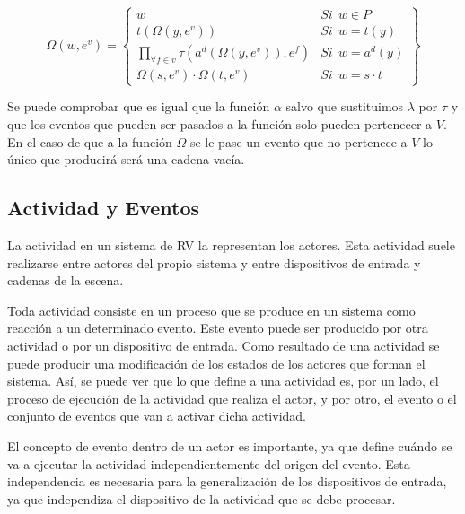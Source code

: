 \documentclass{egpubl}
\begin{document}
\begin{equation}
 	\Omega (w, e^{v}) = \left\{
	\begin{matrix}
		w    &    \mathit{Si} \ \ w \in P  \\

		t( \Omega (y, e^{v}))    &    \mathit{Si} \ \ w = t(y)  \\

		\underset{ \forall f \in v} {\prod} \tau (a^{d} (\Omega (y, e^{v})), e^{f})  &
			\mathit{Si}  \ \ w = a^{d}(y)   \\

		\Omega (s, e^{v}) \cdot \Omega (t, e^{v})   &  \mathit{Si} \ \ w = s {\cdot} t
	\end{matrix}\right\}
\end{equation}



Se puede comprobar que es igual que la
funci\'on $\alpha$ salvo que sustituimos $\lambda$ por $\tau$ y que los eventos que
pueden ser pasados a la funci\'on solo pueden pertenecer a $V$. 
En el caso de que a la funci\'on $\Omega$ se le pase
un evento que no pertenece a $V$ lo \'unico que producir\'a ser\'a una
cadena vac\'ia.





\subsection{Actividad y Eventos
\label{sec:actividad_eventos}}

La actividad en un sistema de RV la representan los actores. Esta
actividad suele realizarse entre actores del propio sistema y entre 
dispositivos de entrada y cadenas de la escena.

Toda actividad consiste en un proceso que se produce en un sistema como
reacci\'on a un determinado evento. Este evento puede ser producido por
otra actividad o por un dispositivo de entrada. Como resultado de una
actividad se puede producir una modificaci\'on de los estados de los
actores que forman el sistema. As\'i, se puede ver que lo que define a
una actividad es, por un lado, el proceso de ejecuci\'on de la
actividad que realiza el actor, y por otro, el evento o el conjunto de
eventos que van a activar dicha actividad.

El concepto de evento dentro de un actor es importante, ya que define
cu\'ando se va a ejecutar la actividad independientemente del origen
del evento. Esta independencia es necesaria para la generalizaci\'on de
los dispositivos de entrada, ya que independiza el dispositivo de la
actividad que se debe procesar.
\end{document}
